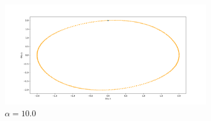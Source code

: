 \documentclass[a4paper,12pt]{article}
\begin{document}
	\begin{figure}[H]
		\centering
				\includegraphics[width=0.8\textwidth]{DEF_8_4.png}
        \caption{$\alpha = 10.0$}
  \end{figure}

	
\end{document}
